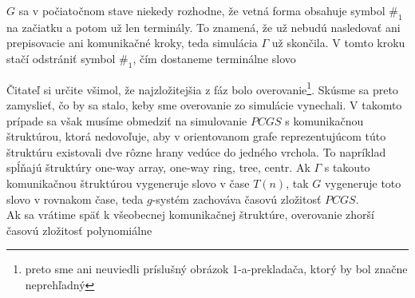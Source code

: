 \begin{dokaz}
\begin{description}
  $G$ sa v počiatočnom stave niekedy rozhodne, že vetná forma
  obsahuje symbol $\#_1$ na začiatku a potom už len terminály. To znamená,
  že už nebudú nasledovať ani prepisovacie ani komunikačné kroky, teda simulácia
  $\Gamma$ už skončila. V tomto kroku stačí odstrániť symbol
  $\#_1$, čím dostaneme terminálne slovo
\end{description}
Čitateľ si určite všimol, že najzložitejšia z fáz bolo
overovanie\footnote{preto sme ani neuviedli príslušný obrázok
1-a-prekladača, ktorý by bol značne neprehľadný}. Skúsme sa preto
zamyslieť, čo by sa stalo, keby sme overovanie zo simulácie
vynechali. V takomto prípade sa však musíme obmedziť na
simulovanie $PCGS$ s komunikačnou štruktúrou, ktorá nedovoľuje,
aby v orientovanom grafe reprezentujúcom túto štruktúru existovali
dve rôzne hrany vedúce do jedného vrchola. To napríklad spĺňajú
štruktúry one-way array, one-way ring, tree, centr. Ak $\Gamma$ s
takouto komunikačnou štruktúrou vygeneruje slovo v čase $T(n)$,
tak $G$ vygeneruje toto slovo v rovnakom čase, teda $g$-systém
zachováva časovú zložitosť $PCGS$.
\\ Ak sa vrátime späť k všeobecnej komunikačnej štruktúre,
overovanie zhorší časovú zložitosť polynomiálne
\end{dokaz}
